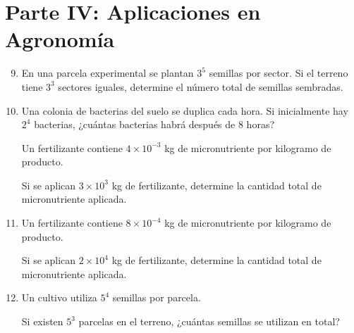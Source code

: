 \documentclass[12pt]{article}
\begin{document}
	\section*{Parte IV: Aplicaciones en Agronomía}

	\begin{enumerate}
		\setcounter{enumi}{8}
		
		\item
		En una parcela experimental se plantan $3^5$ semillas por sector.
		Si el terreno tiene $3^3$ sectores iguales,
		determine el número total de semillas sembradas.
		
		\item
		Una colonia de bacterias del suelo se duplica cada hora.
		Si inicialmente hay $2^4$ bacterias,
		¿cuántas bacterias habrá después de 8 horas?
		
		
		Un fertilizante contiene $4\times10^{-3}$ kg de micronutriente
		por kilogramo de producto.
		
		Si se aplican $3\times10^3$ kg de fertilizante,
		determine la cantidad total de micronutriente aplicada.
		
		\item
		
		Un fertilizante contiene \(8\times10^{-4}\) kg de micronutriente
		por kilogramo de producto.
		
		Si se aplican \(2\times10^4\) kg de fertilizante,
		determine la cantidad total de micronutriente aplicada.
		
		\item
		
		Un cultivo utiliza \(5^4\) semillas por parcela.
		
		Si existen \(5^3\) parcelas en el terreno,
		¿cuántas semillas se utilizan en total?
		
		\vspace{3cm}
		
	\end{enumerate}

		
\end{document}
